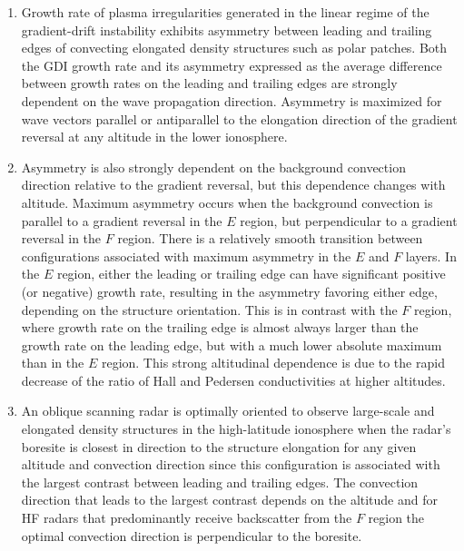 \begin{enumerate}
	\item Growth rate of plasma irregularities generated in the linear regime of the gradient-drift instability exhibits asymmetry between leading and trailing edges of convecting elongated density structures such as polar patches.  Both the GDI growth rate and its asymmetry expressed as the average difference between growth rates on the leading and trailing edges are strongly dependent on the wave propagation direction. Asymmetry is maximized for wave vectors parallel or antiparallel to the elongation direction of the gradient reversal at any altitude in the lower ionosphere.
	\item Asymmetry is also strongly dependent on the background convection direction relative to the gradient reversal, but this dependence changes with altitude. Maximum asymmetry occurs when the background convection is parallel to a gradient reversal in the \(E\) region, but perpendicular to a gradient reversal in the \(F\) region. There is a relatively smooth transition between configurations associated with maximum asymmetry in the \(E\) and \(F\) layers. In the \(E\) region, either the leading or trailing edge can have significant positive (or negative) growth rate, resulting in the asymmetry favoring either edge, depending on the structure orientation. This is in contrast with the \(F\) region, where growth rate on the trailing edge is almost always larger than the growth rate on the leading edge, but with a much lower absolute maximum than in the \(E\) region. This strong altitudinal dependence is due to the rapid decrease of the ratio of Hall and Pedersen conductivities at higher altitudes.
	\item An oblique scanning radar is optimally oriented to observe large-scale and elongated density structures in the high-latitude ionosphere when the radar's boresite is closest in direction to the structure elongation for any given altitude and convection direction since this configuration is associated with the largest contrast between leading and trailing edges. The convection direction that leads to the largest contrast depends on the altitude and for HF radars that predominantly receive backscatter from the \(F\) region the optimal convection direction is perpendicular to the boresite.
\end{enumerate}






